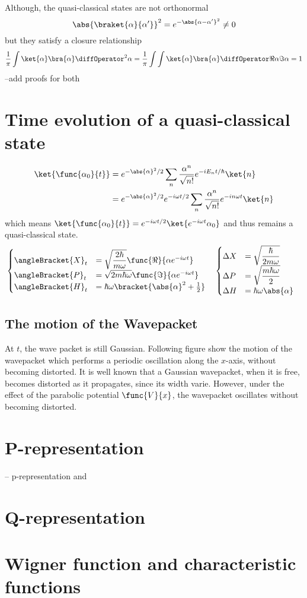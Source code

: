 Although, the quasi-classical states are not orthonormal 
\begin{equation*}
    \abs{\braket{\alpha}{\alpha'}}^2 = e^{-\abs{\alpha - \alpha'}^2} \neq 0
\end{equation*}
but they satisfy a closure relationship 
\begin{equation*}
    \dfrac{1}{\pi} \int \ket{\alpha}\bra{\alpha} \diffOperator^2 \alpha = \dfrac{1}{\pi} \int \int \ket{\alpha} \bra{\alpha} \diffOperator \Re{\alpha} \Im{\alpha} = 1
\end{equation*}
--add proofs for both
\section{Time evolution of a quasi-classical state}
\begin{align*}
    \ket{\func{\alpha_0}{t}} &= e^{- \abs{\alpha}^2/2} \sum_{n} \dfrac{\alpha^n}{\sqrt{n!}} e^{-i E_n t/\hbar} \ket{n}\\
    &= e^{- \abs{\alpha}^2/2} e^{-i\omega t/2} \sum_{n} \dfrac{\alpha^n}{\sqrt{n!}} e^{-i n \omega t} \ket{n}
\end{align*}
which means \(\ket{\func{\alpha_0}{t}} = e^{-i\omega t/2}\ket{e^{-i\omega t} \alpha_0}\) and thus remains a quasi-classical state.
\begin{align*}
    &\begin{cases}
        \angleBracket{X}_t &= \sqrt{\dfrac{2\hbar}{m\omega}} \func{\Re}{\alpha e^{-i \omega t}}\\
        \angleBracket{P}_t &= \sqrt{2m\hbar\omega} \func{\Im}{\alpha e^{-i \omega t}}\\
        \angleBracket{H}_t &= \hbar \omega \bracket{\abs{\alpha}^2 + \frac{1}{2}}
    \end{cases} & 
    & \begin{cases}
        \Delta X &= \sqrt{\dfrac{\hbar}{2m\omega}}\\
        \Delta P &= \sqrt{\dfrac{m\hbar\omega}{2}}\\
        \Delta H &= \hbar \omega \abs{\alpha}
    \end{cases}
\end{align*}
\subsection{The motion of the Wavepacket}
At \(t\), the wave packet is still Gaussian. Following figure show the motion of the wavepacket which performs a periodic oscillation along the \(x\)-axis, without becoming distorted. It is well known that a Gaussian wavepacket, when it is free, becomes distorted as it propagates, since its width varie. However, under the effect of the parabolic potential \(\func{V}{x}\), the wavepacket oscillates without becoming distorted.

\section{P-representation}
-- p-representation and 
\section{Q-representation}
\section{Wigner function and characteristic functions}
